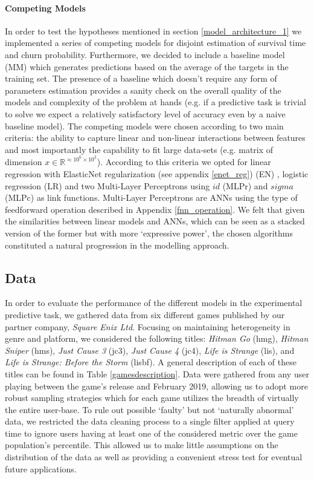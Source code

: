 \paragraph*{Competing Models}
\label{competing_models_1}
In order to test the hypotheses mentioned in section \ref{model_architecture_1} we implemented a series of competing models for disjoint estimation of survival time and churn probability. Furthermore, we decided to include a baseline model (MM) which generates predictions based on the average of the targets in the training set. The presence of a baseline which doesn't require any form of parameters estimation provides a sanity check on the overall quality of the models and complexity of the problem at hands (e.g. if a  predictive task is trivial to solve we expect a relatively satisfactory level of accuracy even by a naive baseline model). The competing models were chosen according to two main criteria: the ability to capture linear and non-linear interactions between features and most importantly the capability to fit large data-sets (e.g. matrix of dimension $x \in \mathbb{R}^{\approx10^6\times10^2}$). According to this criteria we opted for linear regression with ElasticNet regularization (see appendix \ref{enet_reg}) (EN) \cite{zou2005regularization}, logistic regression (LR) and two Multi-Layer Perceptrons using  $id$ (MLPr) and $sigma$ (MLPc) as link functions. Multi-Layer Perceptrons are ANNs using the type of feedforward operation described in Appendix \ref{fnn_operation}. We felt that given the similarities between linear models and ANNs, which can be seen as a stacked version of the former but with more `expressive power', the chosen algorithms constituted a natural progression in the modelling approach. 

\subsection{Data}
\label{data_1}
In order to evaluate the performance of the different models in the experimental predictive task, we gathered data from six different games published by our partner company, \textit{Square Enix Ltd}. Focusing on maintaining heterogeneity in genre and platform, we considered the following titles: \emph{Hitman Go} (hmg), \emph{Hitman Sniper} (hms), \emph{Just Cause 3} (jc3), \emph{Just Cause 4} (jc4), \emph{Life is Strange} (lis), and \emph{Life is Strange: Before the Storm} (lisbf). A general description of each of these titles can be found in Table \ref{gamesdescription}. Data were gathered from any user playing between the game's release and February 2019, allowing us to adopt more robust sampling strategies which for each game utilizes the breadth of virtually the entire user-base. To rule out possible `faulty' but not `naturally abnormal' data, we restricted the data cleaning process to a single filter applied at query time to ignore users having at least one of the considered metric over the game population's  percentile. This allowed us to make little assumptions on the distribution of the data as well as providing a convenient stress test for eventual future applications.

